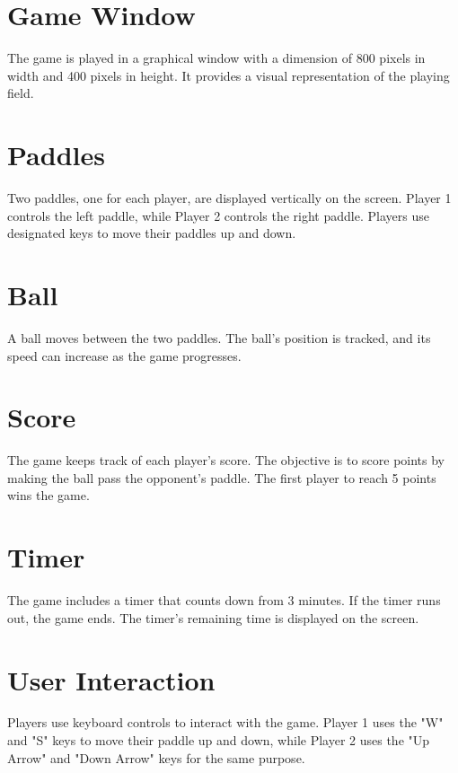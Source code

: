 \documentclass[16pt]{article}
\begin{document}
\section*{Game Window}
\begin{flushleft}
\Large The game is played in a graphical window with a dimension of 800 pixels in width and 400 pixels in height. It provides a visual representation of the playing field.
\end{flushleft}

\section*{Paddles}
\begin{flushleft}
\Large Two paddles, one for each player, are displayed vertically on the screen. Player 1 controls the left paddle, while Player 2 controls the right paddle. Players use designated keys to move their paddles up and down.
\end{flushleft}

\section*{Ball}
\begin{flushleft}
\Large A ball moves between the two paddles. The ball's position is tracked, and its speed can increase as the game progresses.
\end{flushleft}

\section*{Score}
\begin{flushleft}
\Large The game keeps track of each player's score. The objective is to score points by making the ball pass the opponent's paddle. The first player to reach 5 points wins the game.
\end{flushleft}

\section*{Timer}
\begin{flushleft}
\Large The game includes a timer that counts down from 3 minutes. If the timer runs out, the game ends. The timer's remaining time is displayed on the screen.
\end{flushleft}

\section*{User Interaction}
\begin{flushleft}
\Large Players use keyboard controls to interact with the game. Player 1 uses the "W" and "S" keys to move their paddle up and down, while Player 2 uses the "Up Arrow" and "Down Arrow" keys for the same purpose.
\end{flushleft}
\end{document}
